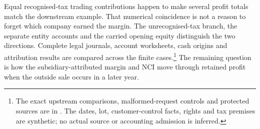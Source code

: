Equal recognised-tax trading contributions happen to make several profit
totals match the downstream example. That numerical coincidence is not a
reason to forget which company earned the margin. The unrecognised-tax branch,
the separate entity accounts and the carried opening equity distinguish the
two directions. Complete legal journals, account worksheets, cash origins and
attribution results are compared across the finite cases.\footnote{The exact
upstream comparisons, malformed-request controls and protected sources are in
.
The dates, lot, customer-control facts, rights and tax premises are synthetic;
no actual source or accounting admission is inferred.}
The remaining question is how the subsidiary-attributed margin and NCI move
through retained profit when the outside sale occurs in a later year.

